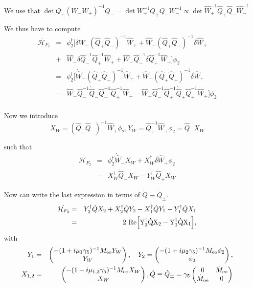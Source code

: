 \documentclass{article}[12pt]
\begin{document}
We use that $\det{ Q_+ (W_- 
 W_+)^{-1} Q_-} = \det{W_+^{-1} Q_+ Q_- W_-^{-1}} \propto\det{\hat{W}_+^{-1} \hat{Q}_+ \hat{Q}_- \hat{W}_-^{-1}}  $

We thus have to compute 
\begin{eqnarray}
\dot{\mathcal{H}_{F_2}}  &=& \phi_2^\dagger\big[ \delta \hat{W}_-
(\hat{Q}_+ \hat{Q}_-)^{-1} \hat{W}_+  +  \hat{W}_-
(\hat{Q}_+ \hat{Q}_-)^{-1} \delta \hat{W}_+ \\
&+&  \hat{W}_- \delta \hat{Q}_-^{-1} \hat{Q}_+^{-1} \hat{W}_+ +
\hat{W}_- \hat{Q}_-^{-1} \delta \hat{Q}_+^{-1} \hat{W}_+   \big] \phi_2 \\
&=& \phi_2^\dagger\big[ \dot{\hat{W}}_-
(\hat{Q}_+ \hat{Q}_-)^{-1} \hat{W}_+  +  \hat{W}_-
(\hat{Q}_+ \hat{Q}_-)^{-1} \delta \hat{W}_+ \\
&-&  \hat{W}_- \hat{Q}_-^{-1} \dot{\hat{Q}}_- \hat{Q}_-^{-1} \hat{Q}_+^{-1} \hat{W}_+ -
\hat{W}_- \hat{Q}_-^{-1} \hat{Q}_+^{-1} \dot{\hat{Q}}_+ \hat{Q}_+^{-1} \hat{W}_+   \big] \phi_2 \\
\end{eqnarray}

Now we introduce 
\begin{equation}
X_W =  (\hat{Q}_+ \hat{Q}_-)^{-1} \hat{W}_+ \phi_2,  Y_W =
\hat{Q}_+^{-1} \hat{W}_+\phi_2 = \hat{Q}_- X_W
\end{equation}

such that 
\begin{eqnarray}
\dot{\mathcal{H}_{F_2}} &=& \phi_2^\dagger  \dot{\hat{W}}_- X_W +
X_W^\dagger  \delta \hat{W}_+ \phi_2 \\
&-& X_W^\dagger \dot{\hat{Q}}_- X_W - Y_W^\dagger   \dot{\hat{Q}}_+  X_W
\end{eqnarray}


Now can write the last expression in terms of $\dot{Q} \equiv
\dot{Q}_{\pm} $.
\begin{eqnarray}
\dot{\mathcal{H}_{F_2}} &=& Y_2^\dagger \dot{Q} X_2 + X_2^\dagger
\dot{Q} Y_2 - X_1^\dagger \dot{Q} Y_1  - Y_1^\dagger \dot{Q} X_1 \\
&=& 2~ \rm{Re}\Big[ Y_2^\dagger \dot{Q} X_2 - Y_1^\dagger \dot{Q}
X_1 \Big],
\end{eqnarray}
with 
\begin{eqnarray}
Y_1 &=& \begin{pmatrix} - (1+i\mu_1\gamma_5)^{-1} M_{\rm{eo}} Y_W \\
  Y_W \end{pmatrix},\quad Y_2  =  \begin{pmatrix} - (1+i\mu_2\gamma_5)^{-1} M_{\rm{eo}} \phi_2 \\
  \phi_2 \end{pmatrix},\\
X_{1,2} &=&  \begin{pmatrix} - (1-i\mu_{1,2}\gamma_5)^{-1} M_{\rm{eo}} X_W \\
  X_W \end{pmatrix}, \dot{Q} \equiv  \dot{Q}_{\pm} =  \gamma_5 \begin{pmatrix} 
 0  & \dot{M}_{\rm{eo}} \\
\dot{M}_{\rm{oe}} & 0\\
\end{pmatrix}
\end{eqnarray}



\end{document}
